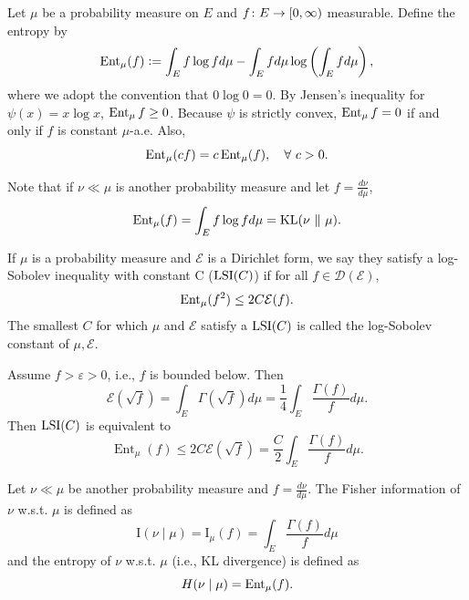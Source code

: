 Let $\mu$ be a probability measure on $E$ and $f \colon E \rightarrow [0,\infty)$ measurable. Define the entropy by
\begin{equation*}
    \operatorname{Ent}_\mu(f) \vcentcolon= \int_E f\log f d\mu - \int_E fd\mu \log \left(\int_E f d\mu\right),
\end{equation*}
where we adopt the convention that $ 0 \log 0 =0$. By Jensen's inequality for $\psi(x) = x \log x$, $\operatorname{Ent}_\mu f \geq 0$. Because $\psi$ is strictly convex, $\operatorname{Ent}_\mu f = 0$ if and only if $f$ is constant $\mu$-a.e. Also,
\begin{equation*}
    \operatorname{Ent}_\mu(cf) = c\operatorname{Ent}_\mu(f),\quad \forall~c > 0.
\end{equation*}
\begin{rmk}
    Note that if $\nu \ll \mu$ is another probability measure and let $f = \frac{d \nu}{d \mu}$, 
    \begin{equation*}
        \operatorname{Ent}_\mu(f) = \int_E f\log f d\mu = \operatorname{KL}(\nu ~\Vert~ \mu).
    \end{equation*}
\end{rmk}

\begin{defn}
    If $\mu$ is a probability measure and $\mathcal{E}$ is a Dirichlet form, we say they satisfy a log-Sobolev inequality with constant C ($\operatorname{LSI}(C)$) if for all $f \in \mathcal{D}(\mathcal{E})$,
    \begin{equation*}
        \operatorname{Ent}_\mu(f^2) \leq 2C \mathcal{E}(f).
    \end{equation*}
    The smallest $C$ for which $\mu$ and $\mathcal{E}$ satisfy a $\operatorname{LSI}(C)$ is called the log-Sobolev constant of $\mu,\mathcal{E}$.
\end{defn}

Assume $f > \varepsilon >0$, i.e., $f$ is bounded below. Then
\begin{equation*}
    \mathcal{E}(\sqrt{f}) = \int_E \Gamma(\sqrt{f})d\mu = \frac{1}{4}\int_E \frac{\Gamma(f)}{f} d\mu.
\end{equation*}
Then $\operatorname{LSI}(C)$ is equivalent to
\begin{equation*}
    \operatorname{Ent}_\mu(f) \leq 2 C \mathcal{E}(\sqrt{f})=\frac{C}{2} \int_E \frac{\Gamma(f)}{f} d \mu.
\end{equation*}

\begin{defn}
    Let $\nu \ll \mu$ be another probability measure and $f = \frac{d \nu}{d \mu}$. The Fisher information of $\nu$ w.s.t. $\mu$ is defined as
    \begin{equation*}
        \mathrm{I}(\nu \mid \mu)=\mathrm{I}_\mu(f)=\int_E \frac{\Gamma(f)}{f} d \mu
    \end{equation*}
    and the entropy of $\nu$ w.s.t. $\mu$ (i.e., KL divergence) is defined as
    \begin{equation*}
        H(\nu \mid \mu) = \operatorname{Ent}_\mu(f).
    \end{equation*}
\end{defn}

